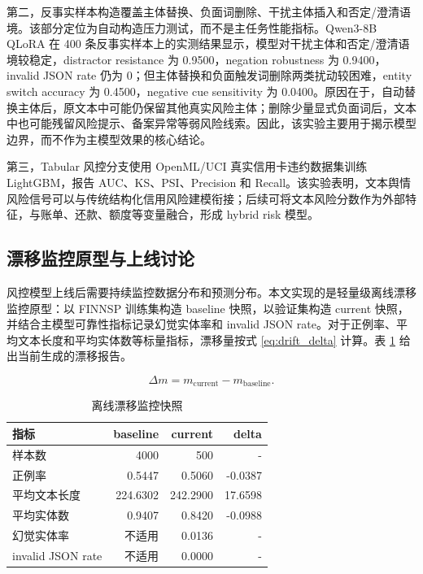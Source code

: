 \documentclass[UTF8,a4paper,12pt]{ctexart}
\begin{document}
第二，反事实样本构造覆盖主体替换、负面词删除、干扰主体插入和否定/澄清语境。该部分定位为自动构造压力测试，而不是主任务性能指标。Qwen3-8B QLoRA 在 400 条反事实样本上的实测结果显示，模型对干扰主体和否定/澄清语境较稳定，distractor resistance 为 0.9500，negation robustness 为 0.9400，invalid JSON rate 仍为 0；但主体替换和负面触发词删除两类扰动较困难，entity switch accuracy 为 0.4500，negative cue sensitivity 为 0.0400。原因在于，自动替换主体后，原文本中可能仍保留其他真实风险主体；删除少量显式负面词后，文本中也可能残留风险提示、备案异常等弱风险线索。因此，该实验主要用于揭示模型边界，而不作为主模型效果的核心结论。

第三，Tabular 风控分支使用 OpenML/UCI 真实信用卡违约数据集训练 LightGBM，报告 AUC、KS、PSI、Precision 和 Recall。该实验表明，文本舆情风险信号可以与传统结构化信用风险建模衔接；后续可将文本风险分数作为外部特征，与账单、还款、额度等变量融合，形成 hybrid risk 模型。

\subsection{漂移监控原型与上线讨论}

风控模型上线后需要持续监控数据分布和预测分布。本文实现的是轻量级离线漂移监控原型：以 FINNSP 训练集构造 baseline 快照，以验证集构造 current 快照，并结合主模型可靠性指标记录幻觉实体率和 invalid JSON rate。对于正例率、平均文本长度和平均实体数等标量指标，漂移量按式 \ref{eq:drift_delta} 计算。表 \ref{tab:drift_monitoring} 给出当前生成的漂移报告。

\begin{equation}
\Delta m=m_{\mathrm{current}}-m_{\mathrm{baseline}}.
\label{eq:drift_delta}
\end{equation}

\begin{table}[H]
\centering
\caption{离线漂移监控快照}
\label{tab:drift_monitoring}
\small
\begin{tabular}{lrrr}
\toprule
指标 & baseline & current & delta \\
\midrule
样本数 & 4000 & 500 & - \\
正例率 & 0.5447 & 0.5060 & -0.0387 \\
平均文本长度 & 224.6302 & 242.2900 & 17.6598 \\
平均实体数 & 0.9407 & 0.8420 & -0.0988 \\
幻觉实体率 & 不适用 & 0.0136 & - \\
invalid JSON rate & 不适用 & 0.0000 & - \\
\bottomrule
\end{tabular}
\end{table}
\end{document}
